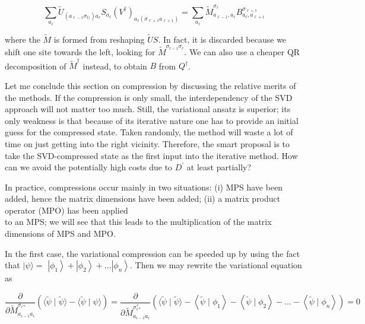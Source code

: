 \documentclass[12pt]{article}
\begin{document}
\begin{equation*}
\sum_{a_{\ell}} \tilde{U}_{\left(a_{\ell-1} \sigma_{t)}\right) a_{\ell}} S_{a_{\ell}}\left(V^{\dagger}\right)_{a_{\ell}\left(\sigma_{\ell+1} a_{\ell+1}\right)}=\sum_{a_{\ell}} \tilde{M}_{a_{\ell-1}, a_{\ell}}^{\sigma_{\ell}} B_{a_{\ell}, a_{\ell+1}}^{\sigma_{\ell+1}} \tag{154}
\end{equation*}


where the $\tilde{M}$ is formed from reshaping $\tilde{U} S$. In fact, it is discarded because we shift one site towards the left, looking for $\tilde{M}^{\sigma_{t-1} \sigma_{\ell}}$. We can also use a cheaper QR decomposition of $\tilde{M}^{\dagger}$ instead, to obtain $B$ from $Q^{\dagger}$.

Let me conclude this section on compression by discussing the relative merits of the methods. If the compression is only small, the interdependency of the SVD approach will not matter too much. Still, the variational ansatz is superior; its only weakness is that because of its iterative nature one has to provide an initial guess for the compressed state. Taken randomly, the method will waste a lot of time on just getting into the right vicinity. Therefore, the smart proposal is to take the SVD-compressed state as the first input into the iterative method. How can we avoid the potentially high costs due to $D^{\prime}$ at least partially?

In practice, compressions occur mainly in two situations: (i) MPS have been added, hence the matrix dimensions have been added; (ii) a matrix product operator (MPO) has been applied\\
to an MPS; we will see that this leads to the multiplication of the matrix dimensions of MPS and MPO.

In the first case, the variational compression can be speeded up by using the fact that $|\psi\rangle=$ $\left|\phi_{1}\right\rangle+\left|\phi_{2}\right\rangle+\ldots\left|\phi_{n}\right\rangle$. Then we may rewrite the variational equation as


\begin{equation*}
\frac{\partial}{\partial \tilde{M}_{a_{i-1} a_{i}}^{\sigma_{i *}}}(\langle\tilde{\psi} \mid \tilde{\psi}\rangle-\langle\tilde{\psi} \mid \psi\rangle)=\frac{\partial}{\partial \tilde{M}_{a_{i-1} a_{i}}^{\sigma_{i *}^{*}}}\left(\langle\tilde{\psi} \mid \tilde{\psi}\rangle-\left\langle\tilde{\psi} \mid \phi_{1}\right\rangle-\left\langle\tilde{\psi} \mid \phi_{2}\right\rangle-\ldots-\left\langle\tilde{\psi} \mid \phi_{n}\right\rangle\right)=0 \tag{155}
\end{equation*}
\end{document}

